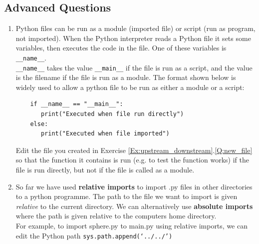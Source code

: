 \documentclass[11pt]{report}
\begin{document}
\subsection*{Advanced Questions}

\begin{enumerate}[label=(\Alph*)]
    
    \item Python files can be run as a module (imported file) or script (run as program, not imported). When the Python interpreter reads a Python file it sets some variables, then executes the code in the file. One of these variables is {\tt \_\_name\_\_}.\\ {\tt \_\_name\_\_} takes the value {\tt \_\_main\_\_} if the file is run as a script, and the value is the filename if the file is run as a module. The format shown below is widely used to allow a python file to be run as either a module or a script:
    
    \begin{verbatim}
    if __name__ == "__main__":
       print("Executed when file run directly")
    else:
       print("Executed when file imported")
    \end{verbatim}
    
    Edit the file you created in Exercise \ref{Ex:upstream_downstream}.\ref{Q:new_file} so that the function it contains is run (e.g. to test the function works) if the file is run directly, but not if the file is called as a module. 
    
    
    
    
    \item So far we have used {\bf relative imports} to import .py files in other directories to a python programme. The path to the file we want to import is given {\it relative} to the current directory. We can alternatively use {\bf absolute imports} where the path is given relative to the computers home directory. \\
    For example, to import sphere.py to main.py using relative imports, we can edit the Python path {\tt sys.path.append(`../../')}
    

\end{enumerate}
\end{document}
